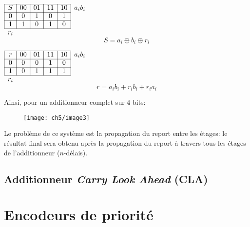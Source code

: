 \begin{minipage}[t]{.3\textwidth}
	\begin{table}[H]
		\centering
		$\begin{array}{|c|c|c|c|c|c}
			\cline{1-5}
			S & 00 & 01 & 11 & 10 & a_ib_i\\
			\cline{1-5}
			0 & 0 & 1 & 0 & 1 & \\
			\cline{1-5}
			1 & 1 & 0 & 1 & 0 & \\
			\cline{1-5}
			\multicolumn{1}{c}{r_i} & \multicolumn{1}{c}{ } & \multicolumn{1}{c}{ } & \multicolumn{1}{c}{ } & \multicolumn{1}{c}{ } & \multicolumn{1}{c}{ } 	
		\end{array}$
		\begin{equation*}
			S = a_i\oplus b_i\oplus r_i
			\end{equation*} 
	\end{table}
\end{minipage}
\begin{minipage}[t]{.3\textwidth}
	\begin{table}[H]
		\centering
		$\begin{array}{|c|c|c|c|c|c}
			\cline{1-5}
			r & 00 & 01 & 11 & 10 & a_ib_i\\
			\cline{1-5}
			0 & 0 & 0 & 1 & 0 & \\
			\cline{1-5}
			1 & 0 & 1 & 1 & 1 & \\
			\cline{1-5}
			\multicolumn{1}{c}{r_i} & \multicolumn{1}{c}{ } & \multicolumn{1}{c}{ } & \multicolumn{1}{c}{ } & \multicolumn{1}{c}{ } & \multicolumn{1}{c}{ } 	
		\end{array}$
		\begin{equation*}
			r = a_ib_i+r_ib_i+r_ia_i
		\end{equation*} 
	\end{table}
\end{minipage}
Ainsi, pour un additionneur complet sur 4 bits:
\begin{figure}[H]
	\centering
	\texttt{[image: ch5/image3]}
\end{figure}
Le problème de ce système est la propagation du report entre les étages: le résultat final sera obtenu après la propagation du report à travers tous les étages de l’additionneur ($n$-délais).
\subsection{Additionneur \textit{Carry Look Ahead} (CLA)}

\section{Encodeurs de priorité}

